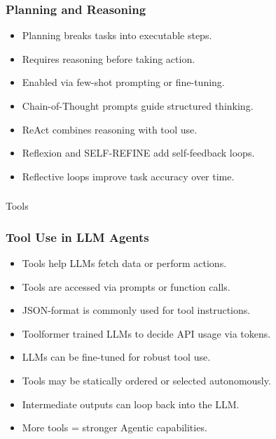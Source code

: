 \begin{frame}[fragile]\frametitle{Planning and Reasoning}

      \begin{itemize}
        \item Planning breaks tasks into executable steps.
        \item Requires reasoning before taking action.
        \item Enabled via few-shot prompting or fine-tuning.
        \item Chain-of-Thought prompts guide structured thinking.
        \item ReAct combines reasoning with tool use.
        \item Reflexion and SELF-REFINE add self-feedback loops.
        \item Reflective loops improve task accuracy over time.
      \end{itemize}

\end{frame}

\begin{frame}[fragile]\frametitle{}
\begin{center}
{\Large Tools}
\end{center}
\end{frame}

\begin{frame}[fragile]\frametitle{Tool Use in LLM Agents}

      \begin{itemize}
        \item Tools help LLMs fetch data or perform actions.
        \item Tools are accessed via prompts or function calls.
        \item JSON-format is commonly used for tool instructions.
        \item Toolformer trained LLMs to decide API usage via tokens.
        \item LLMs can be fine-tuned for robust tool use.
        \item Tools may be statically ordered or selected autonomously.
        \item Intermediate outputs can loop back into the LLM.
        \item More tools = stronger Agentic capabilities.
      \end{itemize}

\end{frame}

